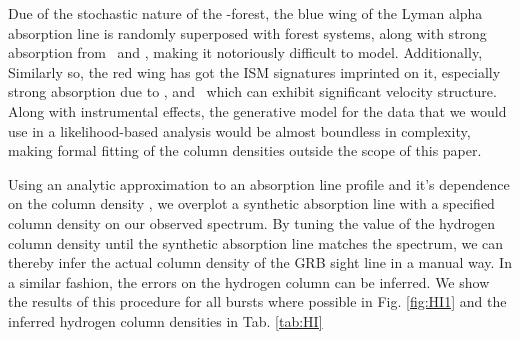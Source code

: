 \documentclass{aa}    %
\begin{document}
Due of the stochastic nature of the \lya-forest, the blue wing of the Lyman
alpha absorption line is randomly superposed with forest systems, along with
strong absorption from \mnii~and \SIiii, making it notoriously difficult to
model. Additionally, Similarly so, the red wing has got the ISM signatures
imprinted on it, especially strong absorption due to \SIii, \sii and \nv~which
can exhibit significant velocity structure. Along with instrumental effects, the
generative model for the data that we would use in a likelihood-based analysis
would be almost boundless in complexity, making formal fitting of the column
densities outside the scope of this paper.

Using an analytic approximation to an absorption line profile and it's
dependence on the column density \citep{TepperGarcia2006}, we overplot a
synthetic absorption line with a specified column density on our observed
spectrum. By tuning the value of the hydrogen column density until the synthetic
absorption line matches the spectrum, we can thereby infer the actual column
density of the GRB sight line in a manual way. In a similar fashion, the errors
on the hydrogen column can be inferred. We show the results of this procedure
for all bursts where possible in Fig. \ref{fig:HI1} and the inferred hydrogen
column densities in Tab. \ref{tab:HI}


\end{document}
